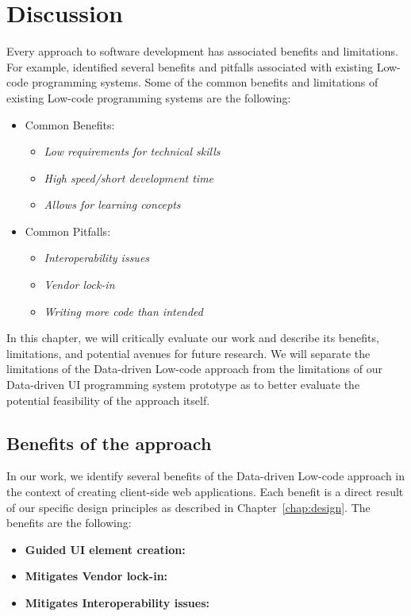 \chapter{Discussion}
\label{chap:discussion}

Every approach to software development has associated benefits and limitations.
For example, \citet{Pinho_Aguiar_Amaral_2023} identified several benefits and pitfalls associated with existing Low-code programming systems.
Some of the common benefits and limitations of existing Low-code programming systems are the following:
\begin{itemize}
	\item Common Benefits:
	      \begin{itemize}
		      \item \emph{Low requirements for technical skills}
		      \item \emph{High speed/short development time}
		      \item \emph{Allows for learning concepts}
	      \end{itemize}

	\item Common Pitfalls:
	      \begin{itemize}
		      \item \emph{Interoperability issues}
		      \item \emph{Vendor lock-in}
		      \item \emph{Writing more code than intended}
	      \end{itemize}
\end{itemize}


In this chapter, we will critically evaluate our work and describe its benefits, limitations, and potential avenues for future research.
We will separate the limitations of the Data-driven Low-code approach from the limitations of our Data-driven UI programming system prototype as to
better evaluate the potential feasibility of the approach itself.

\section{Benefits of the approach}

In our work, we identify several benefits of the Data-driven Low-code approach in the context of creating client-side web applications.
Each benefit is a direct result of our specific design principles as described in Chapter~\ref{chap:design}.
The benefits are the following:
\begin{itemize}
	\item \textbf{Guided UI element creation:}
	\item \textbf{Mitigates Vendor lock-in:}
	\item \textbf{Mitigates Interoperability issues:}
\end{itemize}


